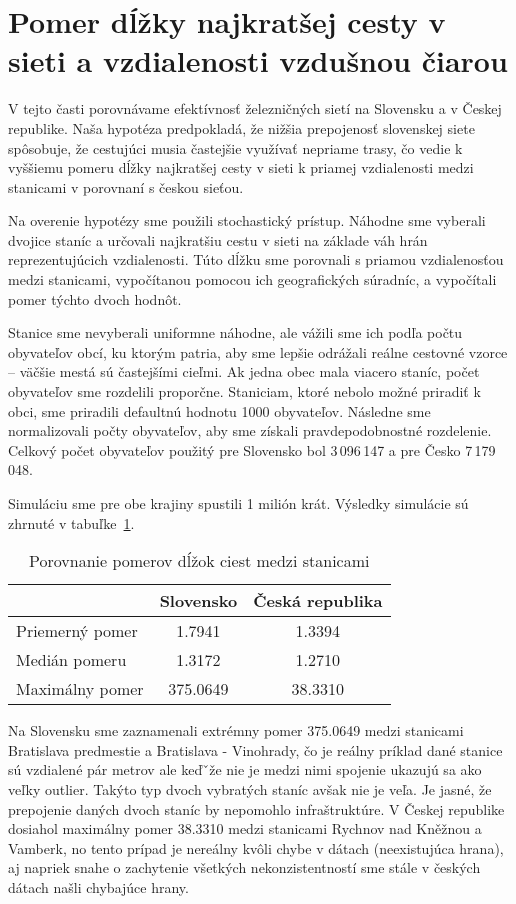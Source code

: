\documentclass[main.tex]{subfiles}
\begin{document}
	
\section{Pomer dĺžky najkratšej cesty v sieti a vzdialenosti vzdušnou čiarou}
\label{sec:random_paths}

V tejto časti porovnávame efektívnosť železničných sietí na Slovensku a v Českej republike. Naša hypotéza predpokladá, že nižšia prepojenosť slovenskej siete spôsobuje, že cestujúci musia častejšie využívať nepriame trasy, čo vedie k vyššiemu pomeru dĺžky najkratšej cesty v sieti k priamej vzdialenosti medzi stanicami v porovnaní s českou sieťou.

Na overenie hypotézy sme použili stochastický prístup. Náhodne sme vyberali dvojice staníc a určovali najkratšiu cestu v sieti na základe váh hrán reprezentujúcich vzdialenosti. Túto dĺžku sme porovnali s priamou vzdialenosťou medzi stanicami, vypočítanou pomocou ich geografických súradníc, a vypočítali pomer týchto dvoch hodnôt.

Stanice sme nevyberali uniformne náhodne, ale vážili sme ich podľa počtu obyvateľov obcí, ku ktorým patria, aby sme lepšie odrážali reálne cestovné vzorce – väčšie mestá sú častejšími cieľmi. Ak jedna obec mala viacero staníc, počet obyvateľov sme rozdelili proporčne. Staniciam, ktoré nebolo možné priradiť k obci, sme priradili defaultnú hodnotu 1000 obyvateľov. Následne sme normalizovali počty obyvateľov, aby sme získali pravdepodobnostné rozdelenie. Celkový počet obyvateľov použitý pre Slovensko bol 3\,096\,147 a pre Česko 7\,179\,048.

Simuláciu sme pre obe krajiny spustili 1 milión krát. Výsledky simulácie sú zhrnuté v tabuľke~\ref{tab:ratios}.

\begin{table}[H]
\centering
\begin{tabular}{|l|c|c|}
\hline
 & Slovensko & Česká republika \\
\hline
Priemerný pomer & 1.7941 & 1.3394 \\
Medián pomeru & 1.3172 & 1.2710 \\
Maximálny pomer & 375.0649 & 38.3310 \\
\hline
\end{tabular}
\caption{Porovnanie pomerov dĺžok ciest medzi stanicami}
\label{tab:ratios}
\end{table}

Na Slovensku sme zaznamenali extrémny pomer 375.0649 medzi stanicami Bratislava predmestie a Bratislava - Vinohrady, čo je reálny príklad dané stanice sú vzdialené pár metrov ale keďˇže nie je medzi nimi spojenie ukazujú sa ako veľky outlier. Takýto typ dvoch vybratých staníc avšak nie je veľa. Je jasné, že prepojenie daných dvoch staníc by nepomohlo infraštruktúre. V Českej republike dosiahol maximálny pomer 38.3310 medzi stanicami Rychnov nad Kněžnou a Vamberk, no tento prípad je nereálny kvôli chybe v dátach (neexistujúca hrana), aj napriek snahe o zachytenie všetkých nekonzistentností sme stále v českých dátach našli chybajúce hrany. 
\end{document}

